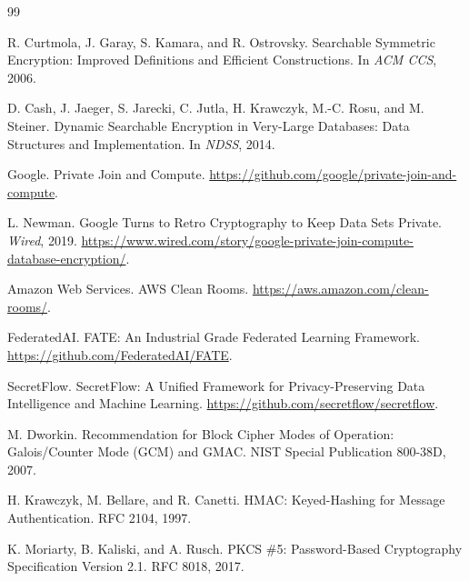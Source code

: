 \documentclass[UTF8,a4paper,12pt,oneside]{ctexrep}
\begin{document}
\begin{thebibliography}{99}

R. Curtmola, J. Garay, S. Kamara, and R. Ostrovsky.
Searchable Symmetric Encryption: Improved Definitions and Efficient Constructions.
In \textit{ACM CCS}, 2006.

D. Cash, J. Jaeger, S. Jarecki, C. Jutla, H. Krawczyk, M.-C. Rosu, and M. Steiner.
Dynamic Searchable Encryption in Very-Large Databases: Data Structures and Implementation.
In \textit{NDSS}, 2014.

Google.
Private Join and Compute.
\url{https://github.com/google/private-join-and-compute}.

L. Newman.
Google Turns to Retro Cryptography to Keep Data Sets Private.
\textit{Wired}, 2019.
\url{https://www.wired.com/story/google-private-join-compute-database-encryption/}.

Amazon Web Services.
AWS Clean Rooms.
\url{https://aws.amazon.com/clean-rooms/}.

FederatedAI.
FATE: An Industrial Grade Federated Learning Framework.
\url{https://github.com/FederatedAI/FATE}.

SecretFlow.
SecretFlow: A Unified Framework for Privacy-Preserving Data Intelligence and Machine Learning.
\url{https://github.com/secretflow/secretflow}.

M. Dworkin.
Recommendation for Block Cipher Modes of Operation: Galois/Counter Mode (GCM) and GMAC.
NIST Special Publication 800-38D, 2007.

H. Krawczyk, M. Bellare, and R. Canetti.
HMAC: Keyed-Hashing for Message Authentication.
RFC 2104, 1997.

K. Moriarty, B. Kaliski, and A. Rusch.
PKCS \#5: Password-Based Cryptography Specification Version 2.1.
RFC 8018, 2017.

\end{thebibliography}
\end{document}
